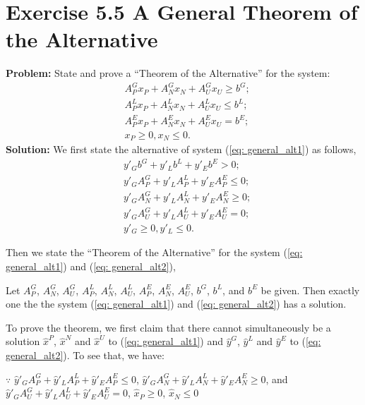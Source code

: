\section{Exercise 5.5 A General Theorem of the Alternative}
\textbf{Problem:} State and prove a ``Theorem of the Alternative'' for the system:
\begin{equation}
\label{eq: general_alt1}
  \begin{array}{lrcll}
    & A^G_Px_P + A^G_Nx_N + A^G_Ux_U \geq b^G;\\
    & A^L_Px_P + A^L_Nx_N + A^L_Ux_U \leq b^L;\\
    & A^E_Px_P + A^E_Nx_N + A^E_Ux_U = b^E;\\
    & x_P\geq0, x_N\leq0.
  \end{array}
\end{equation}
\textbf{Solution:}
We first state the alternative of system (\ref{eq: general_alt1}) as follows,
\begin{equation}
\label{eq: general_alt2}
  \begin{array}{lrcll}
    & y'_Gb^G +y'_Lb^L + y'_Eb^E >0; \\ 
    & y'_GA^G_P + y'_LA^L_P + y'_EA^E_P \leq 0;\\
    & y'_GA^G_N + y'_LA^L_N + y'_EA^E_N \geq 0;\\
    & y'_GA^G_U + y'_LA^L_U + y'_EA^E_U = 0;\\
    & y'_G\geq0, y'_L\leq0.
  \end{array}
\end{equation}

Then we state the ``Theorem of the Alternative'' for the system (\ref{eq: general_alt1}) and (\ref{eq: general_alt2}),
\begin{thm}
Let $A^G_P$, $A^G_N$, $A^G_U$, $A^L_P$, $A^L_N$, $A^L_U$, $A^E_P$, $A^E_N$, $A^E_U$, $b^G$, $b^L$, and $b^E$ be given. Then exactly one the the system (\ref{eq: general_alt1}) and (\ref{eq: general_alt2}) has a solution.
\end{thm}

To prove the theorem, we first claim that there cannot simultaneously be a solution $\widehat{x}^P$, $\widehat{x}^N$ and $\widehat{x}^U$ to (\ref{eq: general_alt1}) and  $\widehat{y}^G$, $\widehat{y}^L$ and $\widehat{y}^E$ to (\ref{eq: general_alt2}). To see that, we have:

$\because $ $\widehat{y}'_GA^G_P + \widehat{y}'_LA^L_P + \widehat{y}'_EA^E_P \leq 0$, $\widehat{y}'_GA^G_N + \widehat{y}'_LA^L_N + \widehat{y}'_EA^E_N \geq 0$, and $\widehat{y}'_GA^G_U + \widehat{y}'_LA^L_U + \widehat{y}'_EA^E_U = 0$, $\widehat{x}_P\geq0$, $\widehat{x}_N\leq0$


